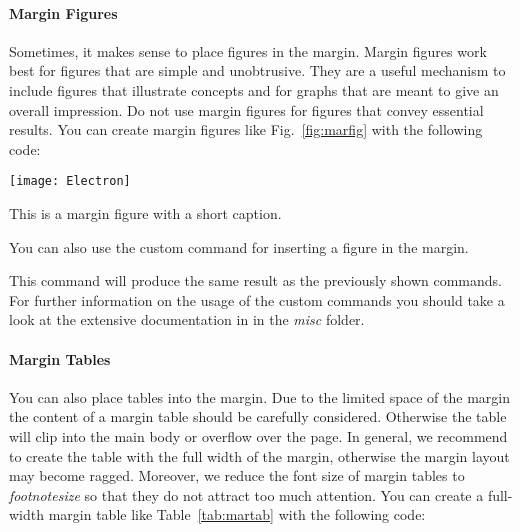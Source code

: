 \paragraph{Margin Figures} Sometimes, it makes sense to place figures in the margin. Margin figures work best for figures that are simple and unobtrusive. They are a useful mechanism to include figures that illustrate concepts and for graphs that are meant to give an overall impression. Do not use margin figures for figures that convey essential results.
%
You can create margin figures like Fig.~\ref{fig:marfig} with the following code:
\begin{latex}
\begin{marginfigure}[1\baselineskip] %
\texttt{[image: Electron]}
\caption{\label{fig:marfig}This is a margin figure with a short caption.}
\end{marginfigure}
\end{latex}

You can also use the custom command  for inserting a figure in the margin.

\begin{latex}
\end{latex}

This command will produce the same result as the previously shown commands.
For further information on the usage of the custom commands you should take a look at the extensive documentation in  in the \emph{misc} folder.

\paragraph{Margin Tables} You can also place tables into the margin. Due to the limited space of the margin the content of a margin table should be carefully considered. Otherwise the table will clip into the main body or overflow over the page. In general, we recommend to create the table with the full width of the margin, otherwise the margin layout may become ragged. Moreover, we reduce the font size of margin tables to \emph{footnotesize} so that they do not attract too much attention.
%
You can create a full-width margin table like Table~\ref{tab:martab} with the following code:

